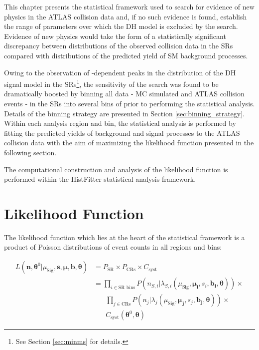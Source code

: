 \label{chapter:stat}

This chapter presents the statistical framework used to search for evidence of new physics in the ATLAS collision data and, if no such evidence is found, establish the range of parameters over which the DH model is excluded by the search. Evidence of new physics would take the form of a statistically significant discrepancy between distributions of the observed collision data in the SRs compared with distributions of the predicted yield of SM background processes.

Owing to the observation of \ms-dependent peaks in the \minms distribution of the DH signal model in the SRs\footnote{See Section \ref{sec:minms} for details.}, the sensitivity of the search was found to be dramatically boosted by binning all data - MC simulated and ATLAS collision events - in the SRs into several bins of \minms prior to performing the statistical analysis. Details of the binning strategy are presented in Section \ref{sec:binning_strategy}. Within each analysis region and bin, the statistical analysis is performed by fitting the predicted yields of background and signal processes to the ATLAS collision data with the aim of maximizing the likelihood function presented in the following section. 

The computational construction and analysis of the likelihood function is performed within the HistFitter \cite{Baak_2015} statistical analysis framework.

\section{Likelihood Function}
\label{sec:likelihood}

The likelihood function which lies at the heart of the statistical framework is a product of Poisson distributions of event counts in all regions and bins:

\begin{equation}
\label{eq:likelihood_func}
\begin{aligned}
L(\boldsymbol{n}, \boldsymbol{\theta}^0|\mu_\text{Sig}, \boldsymbol{s}, \boldsymbol{\mu}, \boldsymbol{b}, \boldsymbol{\theta}) & = P_\text{SR} \times P_\text{CRs} \times C_\text{syst} \\
& = \prod_{i\in\text{SR bins}} P(n_{S,i}|\lambda_{S,i}(\mu_\text{Sig}, \boldsymbol{\mu_i}, s_i, \boldsymbol{b_i}, \boldsymbol{\theta})) \times \\ 
&\phantom{xxx}\prod_{j \in \text{CRs}} P(n_j|\lambda_j(\mu_\text{Sig}, \boldsymbol{\mu_j}, s_j, \boldsymbol{b_j}, \boldsymbol{\theta})) \times \\
&\phantom{xxx}C_\text{syst}(\boldsymbol{\theta}^0, \boldsymbol{\theta})
\end{aligned}
\end{equation}

